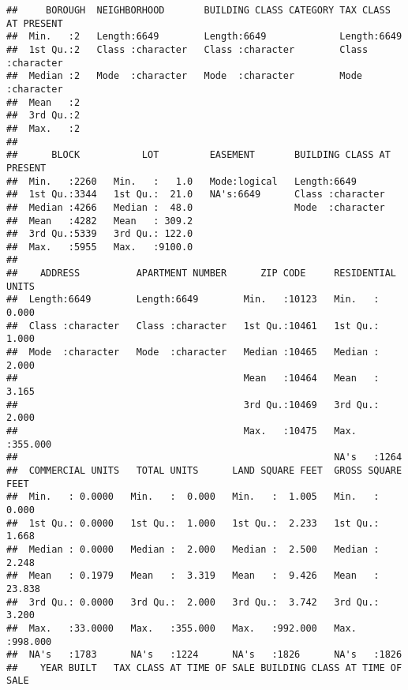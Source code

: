 \documentclass[
]{article}
\begin{document}
\begin{verbatim}
##     BOROUGH  NEIGHBORHOOD       BUILDING CLASS CATEGORY TAX CLASS AT PRESENT
##  Min.   :2   Length:6649        Length:6649             Length:6649         
##  1st Qu.:2   Class :character   Class :character        Class :character    
##  Median :2   Mode  :character   Mode  :character        Mode  :character    
##  Mean   :2                                                                  
##  3rd Qu.:2                                                                  
##  Max.   :2                                                                  
##                                                                             
##      BLOCK           LOT         EASEMENT       BUILDING CLASS AT PRESENT
##  Min.   :2260   Min.   :   1.0   Mode:logical   Length:6649              
##  1st Qu.:3344   1st Qu.:  21.0   NA's:6649      Class :character         
##  Median :4266   Median :  48.0                  Mode  :character         
##  Mean   :4282   Mean   : 309.2                                           
##  3rd Qu.:5339   3rd Qu.: 122.0                                           
##  Max.   :5955   Max.   :9100.0                                           
##                                                                          
##    ADDRESS          APARTMENT NUMBER      ZIP CODE     RESIDENTIAL UNITS
##  Length:6649        Length:6649        Min.   :10123   Min.   :  0.000  
##  Class :character   Class :character   1st Qu.:10461   1st Qu.:  1.000  
##  Mode  :character   Mode  :character   Median :10465   Median :  2.000  
##                                        Mean   :10464   Mean   :  3.165  
##                                        3rd Qu.:10469   3rd Qu.:  2.000  
##                                        Max.   :10475   Max.   :355.000  
##                                                        NA's   :1264     
##  COMMERCIAL UNITS   TOTAL UNITS      LAND SQUARE FEET  GROSS SQUARE FEET
##  Min.   : 0.0000   Min.   :  0.000   Min.   :  1.005   Min.   :  0.000  
##  1st Qu.: 0.0000   1st Qu.:  1.000   1st Qu.:  2.233   1st Qu.:  1.668  
##  Median : 0.0000   Median :  2.000   Median :  2.500   Median :  2.248  
##  Mean   : 0.1979   Mean   :  3.319   Mean   :  9.426   Mean   : 23.838  
##  3rd Qu.: 0.0000   3rd Qu.:  2.000   3rd Qu.:  3.742   3rd Qu.:  3.200  
##  Max.   :33.0000   Max.   :355.000   Max.   :992.000   Max.   :998.000  
##  NA's   :1783      NA's   :1224      NA's   :1826      NA's   :1826     
##    YEAR BUILT   TAX CLASS AT TIME OF SALE BUILDING CLASS AT TIME OF SALE

\end{verbatim}
\end{document}
